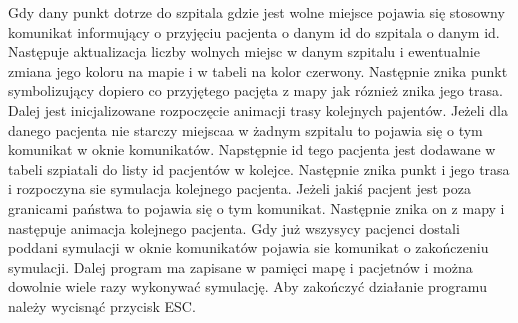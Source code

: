 \documentclass[10pt,a4paper]{article}
\begin{document}
Gdy dany punkt dotrze do szpitala gdzie jest wolne miejsce pojawia się stosowny komunikat informujący o przyjęciu pacjenta o danym id do szpitala o danym id. Następuje aktualizacja liczby wolnych miejsc w danym szpitalu i ewentualnie zmiana jego koloru na mapie i w tabeli na kolor czerwony. Następnie znika punkt symbolizujący dopiero co przyjętego pacjęta z mapy jak róznież znika jego trasa. Dalej jest inicjalizowane rozpoczęcie animacji trasy kolejnych pajentów. Jeżeli dla danego pacjenta nie starczy miejscaa w żadnym szpitalu to pojawia się o tym komunikat w oknie komunikatów. Napstępnie id tego pacjenta jest dodawane w tabeli szpiatali do listy id pacjentów w kolejce. Następnie znika punkt i jego trasa i rozpoczyna sie symulacja kolejnego pacjenta. Jeżeli jakiś pacjent jest poza granicami państwa to pojawia się o tym komunikat. Następnie znika on z mapy i następuje animacja kolejnego pacjenta. Gdy już wszysycy pacjenci dostali poddani symulacji w oknie komunikatów pojawia sie komunikat o zakończeniu symulacji. Dalej program ma zapisane w pamięci mapę i pacjetnów i można dowolnie wiele razy wykonywać symulację. Aby zakończyć działanie programu należy wycisnąć przycisk ESC.
\end{document}
